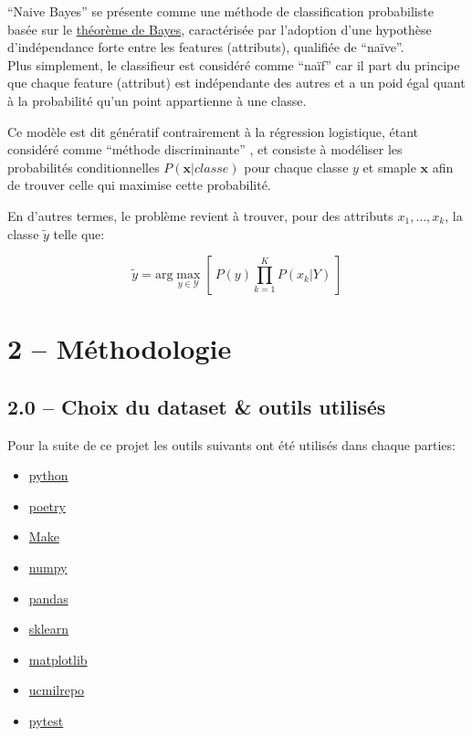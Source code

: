 \documentclass[
]{article}
\providecommand{\tightlist}{%
  \setlength{\itemsep}{0pt}\setlength{\parskip}{0pt}}
\begin{document}
``Naive Bayes'' se présente comme une méthode de classification
probabiliste basée sur le
\href{https://en.wikipedia.org/wiki/Bayes\%27_theorem}{théorème de
Bayes}, caractérisée par l'adoption d'une hypothèse d'indépendance forte
entre les features (attributs), qualifiée de ``naïve''.\\
Plus simplement, le classifieur est considéré comme ``naïf'' car il part
du principe que chaque feature (attribut) est indépendante des autres et
a un poid égal quant à la probabilité qu'un point appartienne à une
classe.

Ce modèle est dit génératif contrairement à la régression logistique,
étant considéré comme ``méthode discriminante''
\cite{ClassifieurLineaire2022}, et consiste à modéliser les probabilités
conditionnelles \(P(\mathbf{x}| classe)\) pour chaque classe \(y\) et
smaple \(\mathbf{x}\) afin de trouver celle qui maximise cette
probabilité.

En d'autres termes, le problème revient à trouver, pour des attributs
\(x_1, \ldots, x_k\), la classe \(\tilde{y}\) telle que:

\[
\tilde{y} = \text{arg}\max_{y \in \mathcal{Y}} \left[\  P(y) \prod_{k = 1}^K{P(x_k | Y)}\  \right]
\]

\newpage

\hypertarget{muxe9thodologie}{%
\section{2 -- Méthodologie}\label{muxe9thodologie}}

\hypertarget{choix-du-dataset-outils-utilisuxe9s}{%
\subsection{2.0 -- Choix du dataset \& outils
utilisés}\label{choix-du-dataset-outils-utilisuxe9s}}

Pour la suite de ce projet les outils suivants ont été utilisés dans
chaque parties:

\begin{itemize}
\tightlist
\item
  \href{https://www.python.org/}{python}
\item
  \href{https://python-poetry.org/}{poetry}
\item
  \href{https://www.gnu.org/software/make/}{Make}
\item
  \href{https://numpy.org/}{numpy}
\item
  \href{https://pandas.pydata.org/}{pandas}
\item
  \href{https://scikit-learn.org/stable/}{sklearn}
\item
  \href{https://matplotlib.org/}{matplotlib}
\item
  \href{https://github.com/uci-ml-repo/ucimlrepo}{ucmilrepo}
\item
  \href{https://docs.pytest.org/en/stable/}{pytest}
\end{itemize}
\end{document}
